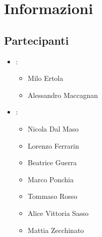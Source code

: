 \section{Informazioni}
\subsection{Partecipanti}

\begin{itemize}
	\item \Proponente:
	\begin{itemize}
		\item Milo Ertola
		\item Alessandro Maccagnan 
	\end{itemize}
	\item \GroupName:
	\begin{itemize}
		\item Nicola Dal Maso
		\item Lorenzo Ferrarin
		\item Beatrice Guerra
		\item Marco Ponchia
		\item Tommaso Rosso
		\item Alice Vittoria Sasso
		\item Mattia Zecchinato
	\end{itemize}
\end{itemize}

\clearpage

